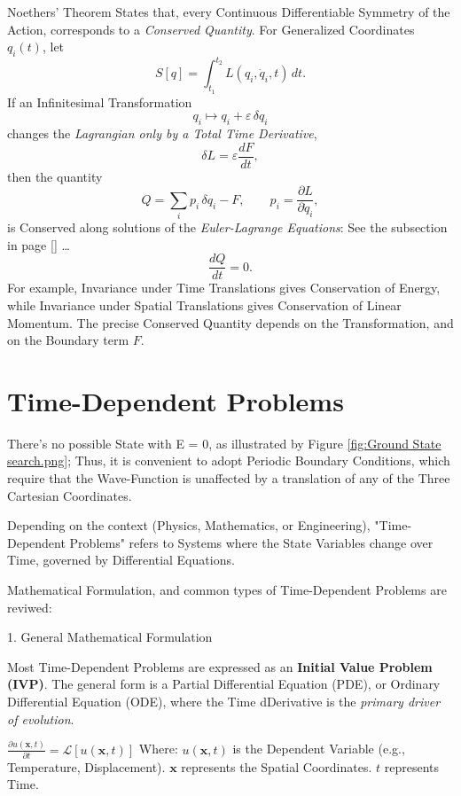 \documentclass[a4paper, 10pt, onepage]{elegantbook}
\begin{document}
{Noethers' Theorem States that, every Continuous Differentiable Symmetry of the Action, corresponds to a \emph{Conserved 
Quantity}. For Generalized Coordinates $q_i(t)$, let
\[
S[q]=\int_{t_1}^{t_2} L(q_i,\dot q_i,t)\,dt.
\]
If an Infinitesimal Transformation
\[
q_i\longmapsto q_i+\varepsilon\,\delta q_i
\]
changes the \emph{Lagrangian only by a Total Time Derivative},
\[
\delta L=\varepsilon\frac{dF}{dt},
\]
then the quantity
\[
Q=\sum_i p_i\,\delta q_i-F,
\qquad
p_i=\frac{\partial L}{\partial \dot q_i},
\]
is Conserved along solutions of the \emph{Euler-Lagrange Equations}: See the subsection in page 
[\pageref{ssec:Connection with the Classical Path}] \ldots
\[
\frac{dQ}{dt}=0.
\]
For example, Invariance under Time Translations gives Conservation of Energy, while Invariance under Spatial 
Translations gives Conservation of Linear Momentum. The precise Conserved Quantity depends on the Transformation, and 
on the Boundary term $F$.

\newpage

\chapter{Time-Dependent Problems}

There's no possible State with E = 0, as illustrated by Figure \ref{fig:Ground State search.png}; Thus, it is 
convenient to adopt Periodic Boundary Conditions, which require that the 
Wave-Function is unaffected by a translation of any of the Three Cartesian Coordinates.  

Depending on the context (Physics, Mathematics, or Engineering), "Time-Dependent Problems" refers to Systems where the 
State Variables change over Time, governed by Differential Equations.  

Mathematical Formulation, and common types of Time-Dependent Problems are reviwed:  

1. General Mathematical Formulation  

Most Time-Dependent Problems are expressed as an \textbf{Initial Value Problem (IVP)}. The general form is a Partial 
Differential Equation (PDE), or Ordinary Differential Equation (ODE), where the Time dDerivative is the \emph{primary 
driver of evolution}.  

$\frac{\partial u(\mathbf{x}, t)}{\partial t} = \mathcal{L}[u(\mathbf{x}, t)]$  
Where: 
 $u(\mathbf{x}, t)$ is the Dependent Variable (e.g., Temperature, Displacement).  
 $\mathbf{x}$ represents the Spatial Coordinates.  
 $t$ represents Time.  

}
\end{document}
